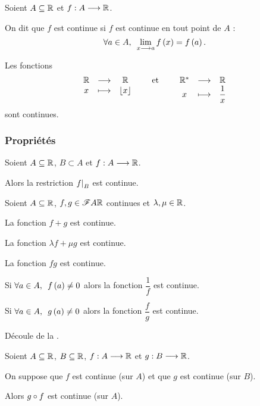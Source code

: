 \begin{defi}[Continuité]
Soient \(A\subseteq\mathbb{R}\) et \(f:A\longrightarrow\mathbb{R}\).

On dit que \(f\) est continue si \(f\) est continue en tout point de \(A\) : \[\quantifs{\forall a\in A}\lim_{x\to a}f\paren{x}=f\paren{a}.\]
\end{defi}

\begin{ex}
Les fonctions \[\begin{array}[t]{ccc}\mathbb{R} & \longrightarrow & \mathbb{R} \\ x & \longmapsto & \left\lfloor x\right\rfloor\end{array}\qquad\text{et}\qquad\begin{array}[t]{ccc}\mathbb{R}^* & \longrightarrow & \mathbb{R} \\ x & \longmapsto & \dfrac{1}{x}\end{array}\] sont continues.
\end{ex}

\subsubsection{Propriétés}

\begin{prop}[Restriction]
Soient \(A\subseteq\mathbb{R}\), \(B\subset A\) et \(f:A\longrightarrow\mathbb{R}\).

Alors la restriction \(\restr{f}{B}\) est continue.
\end{prop}

\begin{prop}
Soient \(A\subseteq\mathbb{R}\), \(f,g\in\mathscr{F}{A}{\mathbb{R}}\) continues et \(\lambda,\mu\in\mathbb{R}\).

La fonction \(f+g\) est continue.

La fonction \(\lambda f+\mu g\) est continue.

La fonction \(fg\) est continue.

Si \(\quantifs{\forall a\in A}f\paren{a}\not=0\) alors la fonction \(\dfrac{1}{f}\) est continue.

Si \(\quantifs{\forall a\in A}g\paren{a}\not=0\) alors la fonction \(\dfrac{f}{g}\) est continue.
\end{prop}

\begin{dem}
Découle de la .
\end{dem}

\begin{prop}[Composition]
Soient \(A\subseteq\mathbb{R}\), \(B\subseteq\mathbb{R}\), \(f:A\longrightarrow\mathbb{R}\) et \(g:B\longrightarrow\mathbb{R}\).

On suppose que \(f\) est continue (sur \(A\)) et que \(g\) est continue (sur \(B\)).

Alors \(g\circ f\) est continue (sur \(A\)).
\end{prop}

